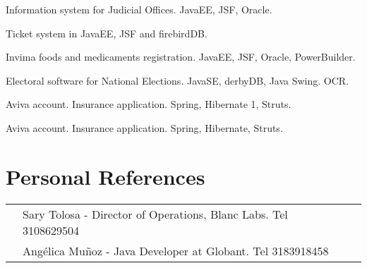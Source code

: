 \documentclass[]{deedy-resume-openfont}
\begin{document}
\begin{minipage}[t]{0.66\textwidth}
\begin{tightemize}
\item Information system for Judicial Offices. JavaEE, JSF, Oracle.   
\end{tightemize}
\sectionsep

\begin{tightemize}
\item Ticket system  in JavaEE, JSF and firebirdDB.  
\end{tightemize}
\sectionsep

\begin{tightemize}
\item Invima foods and medicaments registration. JavaEE, JSF, Oracle, PowerBuilder. 
\item Electoral software for National Elections. JavaSE, derbyDB, Java Swing. OCR. 
\end{tightemize}
\sectionsep

\begin{tightemize}
\item Aviva account. Insurance application. Spring, Hibernate 1, Struts. 
\end{tightemize}
\sectionsep

\begin{tightemize}
\item Aviva account. Insurance application. Spring, Hibernate, Struts. 
\end{tightemize}
\sectionsep


\section{Personal References} 
\begin{tabular}{rll}

& Sary Tolosa - Director of Operations, Blanc Labs. Tel 3108629504 \\
& Angélica Muñoz - Java Developer at Globant. Tel 3183918458\\
\end{tabular}
\sectionsep

\end{minipage} 
\end{document}
